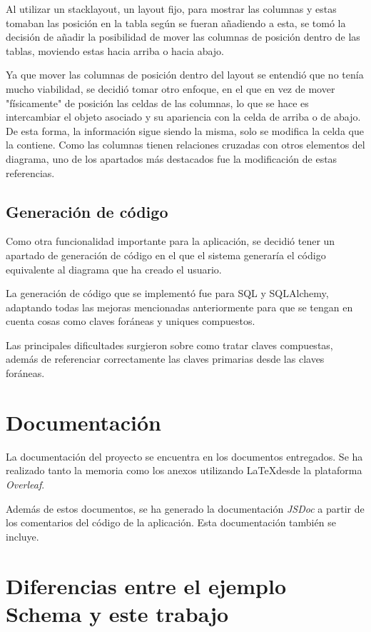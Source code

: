 Al utilizar un stacklayout, un layout fijo, para mostrar las columnas y estas tomaban las posición en la tabla según se fueran añadiendo a esta, se tomó la decisión de añadir la posibilidad de mover las columnas de posición dentro de las tablas, moviendo estas hacia arriba o hacia abajo.

Ya que mover las columnas de posición dentro del layout se entendió que no tenía mucho viabilidad, se decidió tomar otro enfoque, en el que en vez de mover "físicamente" de posición las celdas de las columnas, lo que se hace es intercambiar el objeto asociado y su apariencia con la celda de arriba o de abajo. De esta forma, la información sigue siendo la misma, solo se modifica la celda que la contiene. Como las columnas tienen relaciones cruzadas con otros elementos del diagrama, uno de los apartados más destacados fue la modificación de estas referencias.

\subsection{Generación de código}

Como otra funcionalidad importante para la aplicación, se decidió tener un apartado de generación de código en el que el sistema generaría el código equivalente al diagrama que ha creado el usuario.

La generación de código que se implementó fue para SQL y SQLAlchemy, adaptando todas las mejoras mencionadas anteriormente para que se tengan en cuenta cosas como claves foráneas y uniques compuestos.

Las principales dificultades surgieron sobre como tratar claves compuestas, además de referenciar correctamente las claves primarias desde las claves foráneas.

\section{Documentación}

La documentación del proyecto se encuentra en los documentos entregados. Se ha realizado tanto la memoria como los anexos utilizando \LaTeX desde la plataforma \emph{Overleaf}.

Además de estos documentos, se ha generado la documentación \emph{JSDoc} a partir de los comentarios del código de la aplicación. Esta documentación también se incluye.

\section{Diferencias entre el ejemplo Schema y este trabajo}

